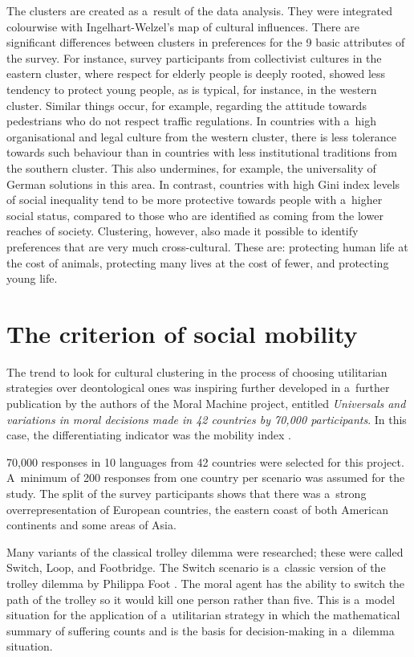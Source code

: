 The clusters are created as a~result of the data analysis. They were integrated colourwise with Ingelhart-Welzel's map of cultural influences. There are significant differences between clusters in preferences for the 9 basic attributes of the survey. For instance, survey participants from collectivist cultures in the eastern cluster, where respect for elderly people is deeply rooted, showed less tendency to protect young people, as is typical, for instance, in the western cluster. Similar things occur, for example, regarding the attitude towards pedestrians who do not respect traffic regulations. In countries with a~high organisational and legal culture from the western cluster, there is less tolerance towards such behaviour than in countries with less institutional traditions from the southern cluster. This also undermines, for example, the universality of German solutions in this area. In contrast, countries with high Gini index levels of social inequality tend to be more protective towards people with a~higher social status, compared to those who are identified as coming from the lower reaches of society. Clustering, however, also made it possible to identify preferences that are very much cross-cultural. These are: protecting human life at the cost of animals, protecting many lives at the cost of fewer, and protecting young life.

\section*{The criterion of social mobility}
The trend to look for cultural clustering in the process of choosing utilitarian strategies over deontological ones was inspiring further developed in a~further publication by the authors of the Moral Machine project, entitled \textit{Universals and variations in moral decisions made in 42 countries by 70,000 participants}. In this case, the differentiating indicator was the mobility index
\parencite[][]{awad_universals_2020}.%


70,000 responses in 10 languages from 42 countries were selected for this project. A~minimum of 200 responses from one country per scenario was assumed for the study. The split of the survey participants shows that there was a~strong overrepresentation of European countries, the eastern coast of both American continents and some areas of Asia.

Many variants of the classical trolley dilemma were researched; these were called Switch, Loop, and Footbridge. The Switch scenario is a~classic version of the trolley dilemma by Philippa Foot
\parencite*[][]{foot_problem_2002}. %
 The moral agent has the ability to switch the path of the trolley so it would kill one person rather than five. This is a~model situation for the application of a~utilitarian strategy in which the mathematical summary of suffering counts and is the basis for decision-making in a~dilemma situation.

